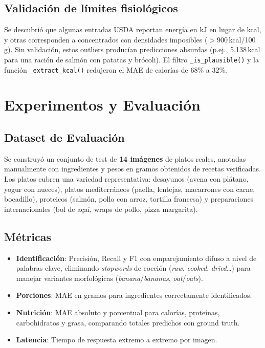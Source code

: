 \documentclass[10pt,a4paper]{article}
\begin{document}
\subsection{Validación de límites fisiológicos}

Se descubrió que algunas entradas USDA reportan energía en kJ en lugar de kcal, y otras
corresponden a concentrados con densidades imposibles ($>900$\,kcal/100\,g). Sin validación, estos
outliers producían predicciones absurdas (p.ej., 5.138\,kcal para una ración de salmón con
patatas y brócoli). El filtro \texttt{\_is\_plausible()} y la función \texttt{\_extract\_kcal()}
redujeron el MAE de calorías de 68\% a 32\%.

\section{Experimentos y Evaluación}

\subsection{Dataset de Evaluación}

Se construyó un conjunto de test de \textbf{14 imágenes} de platos reales, anotadas manualmente con
ingredientes y pesos en gramos obtenidos de recetas verificadas. Los platos cubren una variedad
representativa: desayunos (avena con plátano, yogur con nueces), platos mediterráneos (paella,
lentejas, macarrones con carne, bocadillo), proteicos (salmón, pollo con arroz, tortilla francesa) y
preparaciones internacionales (bol de açaí, wraps de pollo, pizza margarita).

\subsection{Métricas}

\begin{itemize}[noitemsep, topsep=2pt]
  \item \textbf{Identificación}: Precisión, Recall y F1 con emparejamiento difuso a nivel de palabras
        clave, eliminando \textit{stopwords} de cocción (\textit{raw}, \textit{cooked}, \textit{dried}…)
        para manejar variantes morfológicas (\textit{banana}/\textit{bananas}, \textit{oat}/\textit{oats}).
  \item \textbf{Porciones}: MAE en gramos para ingredientes correctamente identificados.
  \item \textbf{Nutrición}: MAE absoluto y porcentual para calorías, proteínas, carbohidratos y grasa,
        comparando totales predichos con ground truth.
  \item \textbf{Latencia}: Tiempo de respuesta extremo a extremo por imagen.
\end{itemize}
\end{document}
